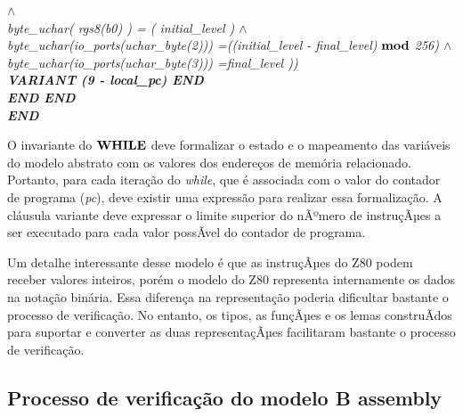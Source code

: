 \documentclass[11pt]{article} %
\begin{document}
{\begin{sloppypar}
$\land$\\
\hspace*{1.10in}\it byte\_uchar\rm ( \it rgs8\rm (\it b0\rm ) \rm ) \rm = \rm ( \it initial\_level \rm )
$\land$\\
\hspace*{1.10in}\it byte\_uchar\rm (\it io\_ports\rm (\it uchar\_byte\rm (\rm 2\rm )\rm )\rm ) \rm
=\hspace*{0.10in}\rm (\rm (\it initial\_level \rm - \it final\_level\rm )  $\mod$  \rm 2\rm 5\rm 6\rm ) 
$\land$\\
\hspace*{1.10in}\it byte\_uchar\rm (\it io\_ports\rm (\it uchar\_byte\rm (\rm 3\rm )\rm )\rm ) \rm
=\hspace*{0.10in}\it final\_level \rm )\rm )\\
\hspace*{0.70in}\bf VARIANT \rm (\rm 9 \rm - \it local\_pc\rm ) \bf END\hspace*{0.50in}\\
\hspace*{0.70in}\bf END
\hspace*{0.20in}\bf END\\
\hspace*{0.40in}\bf END
\end{sloppypar}
}

O invariante do $\WHILE$ deve formalizar o estado e o mapeamento das variáveis do modelo abstrato
com os valores dos endereços de memória relacionado. Portanto, para cada iteração do \textit{while}, que
é associada com o valor do contador de programa (\textit{pc}), deve existir uma expressão para realizar
essa formalização. A cláusula variante deve expressar o limite superior do nÃºmero de instruçÃµes a ser
executado para cada valor possÃ­vel do contador de programa.

Um detalhe interessante desse modelo é que as instruçÃµes do Z80 podem receber valores inteiros,
porém o modelo do Z80 representa internamente os dados na notação binária. Essa diferença na representação poderia
dificultar bastante o processo de verificação. No entanto, os tipos, as funçÃµes e os lemas construÃ­dos
para suportar e converter as duas representaçÃµes facilitaram bastante o processo de verificação.


\subsection{Processo de verificação do modelo B assembly}
\end{document}
